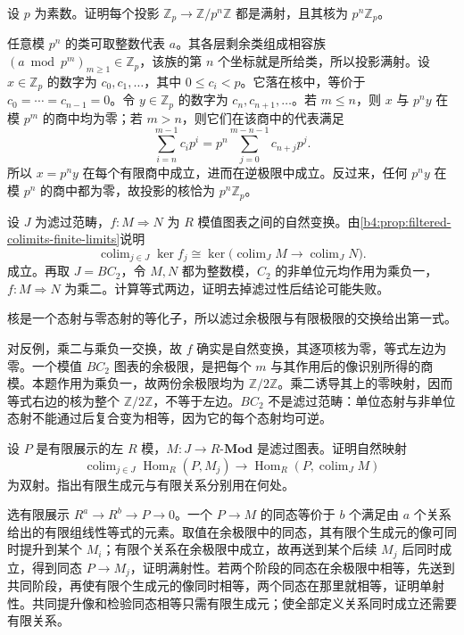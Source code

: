 \begin{exercise}\label{b4:ex:02-modular-projections}
	设 \(p\) 为素数。证明每个投影 \(\mathbb Z_p\rightarrow\mathbb Z/p^n\mathbb Z\) 都是满射，且其核为 \(p^n\mathbb Z_p\)。
\end{exercise}
\begin{solution}
	任意模 \(p^n\) 的类可取整数代表 \(a\)。其各层剩余类组成相容族 \((a\bmod p^m)_{m\geq1}\in\mathbb Z_p\)，该族的第 \(n\) 个坐标就是所给类，所以投影满射。设 \(x\in\mathbb Z_p\) 的数字为 \(c_0,c_1,\ldots\)，其中 \(0\le c_i<p\)。它落在核中，等价于 \(c_0=\cdots=c_{n-1}=0\)。令 \(y\in\mathbb Z_p\) 的数字为 \(c_n,c_{n+1},\ldots\)。若 \(m\le n\)，则 \(x\) 与 \(p^ny\) 在模 \(p^m\) 的商中均为零；若 \(m>n\)，则它们在该商中的代表满足
	\[
		\sum_{i=n}^{m-1}c_ip^i =p^n\sum_{j=0}^{m-n-1}c_{n+j}p^j.
	\]
	所以 \(x=p^ny\) 在每个有限商中成立，进而在逆极限中成立。反过来，任何 \(p^ny\) 在模 \(p^n\) 的商中都为零，故投影的核恰为 \(p^n\mathbb Z_p\)。
\end{solution}

\begin{exercise}\label{b4:ex:02-filtered-kernels}
	设 \(J\) 为滤过范畴，\(f:M\Rightarrow N\) 为 \(R\) 模值图表之间的自然变换。由\cref{b4:prop:filtered-colimits-finite-limits}说明
	\[
		\operatorname{colim}_{j\in J}\ker f_j \cong \ker\bigl(\operatorname{colim}_JM\rightarrow \operatorname{colim}_JN\bigr).
	\]
	成立。再取 \(J=BC_2\)，令 \(M,N\) 都为整数模，\(C_2\) 的非单位元均作用为乘负一，\(f:M\Rightarrow N\) 为乘二。计算等式两边，证明去掉滤过性后结论可能失败。
\end{exercise}
\begin{solution}
	核是一个态射与零态射的等化子，所以滤过余极限与有限极限的交换给出第一式。

	对反例，乘二与乘负一交换，故 \(f\) 确实是自然变换，其逐项核为零，等式左边为零。一个模值 \(BC_2\) 图表的余极限，是把每个 \(m\) 与其作用后的像识别所得的商模。本题作用为乘负一，故两份余极限均为 \(\mathbb Z/2\mathbb Z\)。乘二诱导其上的零映射，因而等式右边的核为整个 \(\mathbb Z/2\mathbb Z\)，不等于左边。\(BC_2\) 不是滤过范畴：单位态射与非单位态射不能通过后复合变为相等，因为它的每个态射均可逆。
\end{solution}

\begin{exercise}\label{b4:ex:02-hom-finite-presentation}
	设 \(P\) 是有限展示的左 \(R\) 模，\(M:J\rightarrow R\text{-}\mathbf{Mod}\) 是滤过图表。证明自然映射
	\[
		\operatorname{colim}_{j\in J}\operatorname{Hom}_R(P,M_j) \longrightarrow \operatorname{Hom}_R(P,\operatorname{colim}_JM)
	\]
	为双射。指出有限生成元与有限关系分别用在何处。
\end{exercise}
\begin{solution}
	选有限展示 \(R^a\rightarrow R^b\rightarrow P\rightarrow0\)。一个 \(P\rightarrow M\) 的同态等价于 \(b\) 个满足由 \(a\) 个关系给出的有限组线性等式的元素。取值在余极限中的同态，其有限个生成元的像可同时提升到某个 \(M_i\)；有限个关系在余极限中成立，故再送到某个后续 \(M_j\) 后同时成立，得到同态 \(P\rightarrow M_j\)，证明满射性。若两个阶段的同态在余极限中相等，先送到共同阶段，再使有限个生成元的像同时相等，两个同态在那里就相等，证明单射性。共同提升像和检验同态相等只需有限生成元；使全部定义关系同时成立还需要有限关系。
\end{solution}

